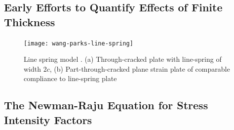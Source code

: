 \subsection{Early Efforts to Quantify Effects of Finite Thickness}

\begin{frame}
\begin{figure}
\centering
\texttt{[image: wang-parks-line-spring]}
\caption{\label{fig:wang-parks-line-spring} Line spring model \citep{wangparks1992}. (a) Through-cracked plate with line-spring of width \(2c\), (b) Part-through-cracked plane strain plate of comparable compliance to line-spring plate}
\end{figure}
\end{frame}

\subsection{The Newman-Raju Equation for Stress Intensity Factors}

